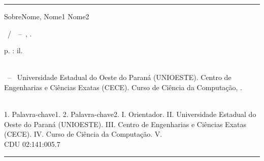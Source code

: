 \begin{fichacatalografica}

	\vspace*{15cm}       %

	\hrule %

	\begin{center}       %

	\begin{minipage}[c]{12.5cm}  %

	SobreNome, Nome1 Nome2 %

	\hspace{0.5cm}  \imprimirtitulo~/~\imprimirautor~--~\imprimirlocal,  \imprimirdata.

	\hspace{0.5cm}  \pageref{LastPage}  p.  :  il.\\

	\hspace{0.5cm}  \imprimirorientadorRotulo ~\imprimirorientador\\

	\hspace{0.5cm}

\parbox[t]{\textwidth}{\imprimirtipotrabalho ~--~ Universidade Estadual do Oeste do Paraná (UNIOESTE). Centro de Engenharias e Ciências Exatas (CECE). Curso de Ciência da Computação, \imprimirdata.}\\

\hspace{0.5cm}
	1.  Palavra-chave1.
	2.  Palavra-chave2.
	I.  Orientador.
	II.  Universidade Estadual do Oeste do Paraná (UNIOESTE).
	III. Centro de Engenharias e Ciências Exatas (CECE).
	IV. Curso de Ciência da Computação.
	V.  \imprimirtitulo\\

	\hspace{8.75cm}  CDU  02:141:005.7\\

	\end{minipage}
	\end{center}
	\hrule
\end{fichacatalografica}
